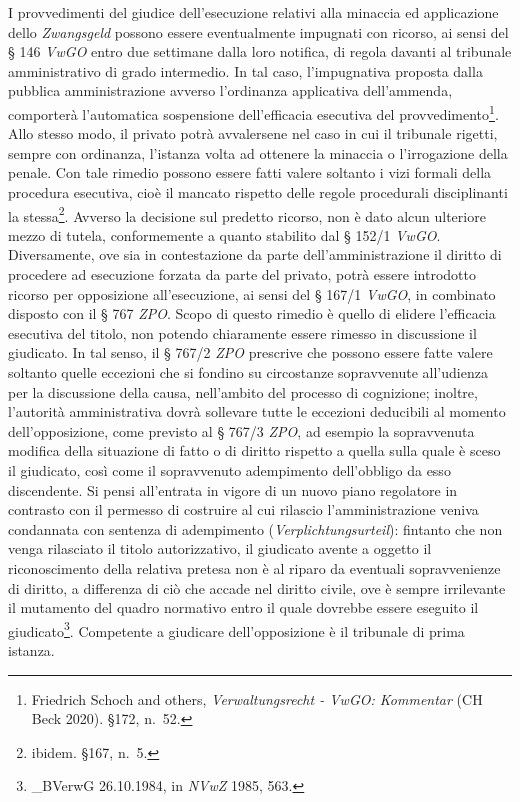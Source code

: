 \documentclass[12pt,it,a4paper,]{report}
\begin{document}
I provvedimenti del giudice dell'esecuzione relativi alla minaccia ed
applicazione dello \emph{Zwangsgeld} possono essere eventualmente
impugnati con ricorso, ai sensi del § 146 \emph{VwGO} entro due
settimane dalla loro notifica, di regola davanti al tribunale
amministrativo di grado intermedio. In tal caso, l'impugnativa proposta
dalla pubblica amministrazione avverso l'ordinanza applicativa
dell'ammenda, comporterà l'automatica sospensione dell'efficacia
esecutiva del provvedimento\footnote{{Friedrich Schoch and others,
  \emph{Verwaltungsrecht - VwGO: Kommentar} (CH Beck 2020).} §172,
  n.~52.}. Allo stesso modo, il privato potrà avvalersene nel caso in
cui il tribunale rigetti, sempre con ordinanza, l'istanza volta ad
ottenere la minaccia o l'irrogazione della penale. Con tale rimedio
possono essere fatti valere soltanto i vizi formali della procedura
esecutiva, cioè il mancato rispetto delle regole procedurali
disciplinanti la stessa\footnote{{ibidem.} §167, n.~5.}. Avverso la
decisione sul predetto ricorso, non è dato alcun ulteriore mezzo di
tutela, conformemente a quanto stabilito dal § 152/1 \emph{VwGO}.
Diversamente, ove sia in contestazione da parte dell'amministrazione il
diritto di procedere ad esecuzione forzata da parte del privato, potrà
essere introdotto ricorso per opposizione all'esecuzione, ai sensi del §
167/1 \emph{VwGO}, in combinato disposto con il § 767 \emph{ZPO}. Scopo
di questo rimedio è quello di elidere l'efficacia esecutiva del titolo,
non potendo chiaramente essere rimesso in discussione il giudicato. In
tal senso, il § 767/2 \emph{ZPO} prescrive che possono essere fatte
valere soltanto quelle eccezioni che si fondino su circostanze
sopravvenute all'udienza per la discussione della causa, nell'ambito del
processo di cognizione; inoltre, l'autorità amministrativa dovrà
sollevare tutte le eccezioni deducibili al momento dell'opposizione,
come previsto al § 767/3 \emph{ZPO}, ad esempio la sopravvenuta modifica
della situazione di fatto o di diritto rispetto a quella sulla quale è
sceso il giudicato, così come il sopravvenuto adempimento dell'obbligo
da esso discendente. Si pensi all'entrata in vigore di un nuovo piano
regolatore in contrasto con il permesso di costruire al cui rilascio
l'amministrazione veniva condannata con sentenza di adempimento
(\emph{Verplichtungsurteil}): fintanto che non venga rilasciato il
titolo autorizzativo, il giudicato avente a oggetto il riconoscimento
della relativa pretesa non è al riparo da eventuali sopravvenienze di
diritto, a differenza di ciò che accade nel diritto civile, ove è sempre
irrilevante il mutamento del quadro normativo entro il quale dovrebbe
essere eseguito il giudicato\footnote{\_BVerwG 26.10.1984, in
  \emph{NVwZ} 1985, 563.}. Competente a giudicare dell'opposizione è il
tribunale di prima istanza.
\end{document}
